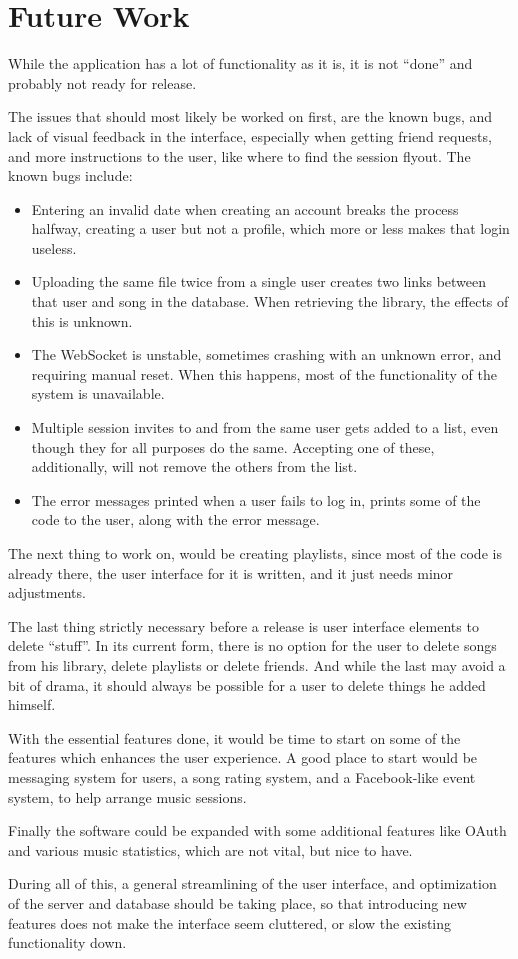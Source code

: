 \section{Future Work}
While the application has a lot of functionality as it is, it is not ``done'' and probably not ready
for release.

The issues that should most likely be worked on first, are the known bugs, and lack of visual feedback
in the interface, especially when getting friend requests, and more instructions to the user, like
where to find the session flyout. The known bugs include:
\begin{itemize}
\item{Entering an invalid date when creating an account breaks the process halfway, creating a user 
but not a profile, which more or less makes that login useless.}
\item{Uploading the same file twice from a single user creates two links between that user and song
in the database. When retrieving the library, the effects of this is unknown.}
\item{The WebSocket is unstable, sometimes crashing with an unknown error, and requiring manual reset.
When this happens, most of the functionality of the system is unavailable.}
\item{Multiple session invites to and from the same user gets added to a list, even though they for all
purposes do the same. Accepting one of these, additionally, will not remove the others from the list.}
\item{The error messages printed when a user fails to log in, prints some of the code to the user,
along with the error message.}
\end{itemize}
The next thing to work on, would be creating playlists, since most of the code is already there, the
user interface for it is written, and it just needs minor adjustments.

The last thing strictly necessary before a release is user interface elements to delete ``stuff''.
In its current form, there is no option for the user to delete songs from his library, delete playlists
or delete friends. And while the last may avoid a bit of drama, it should always be possible for
a user to delete things he added himself.

With the essential features done, it would be time to start on some of the features which enhances
the user experience. A good place to start would be messaging system for users, a song rating
system, and a Facebook-like event system, to help arrange music sessions.

Finally the software could be expanded with some additional features like OAuth and various music statistics, which are not vital, but nice to have.

During all of this, a general streamlining of the user interface, and optimization of the server and
database should be taking place, so that introducing new features does not make the interface seem
cluttered, or slow the existing functionality down.
